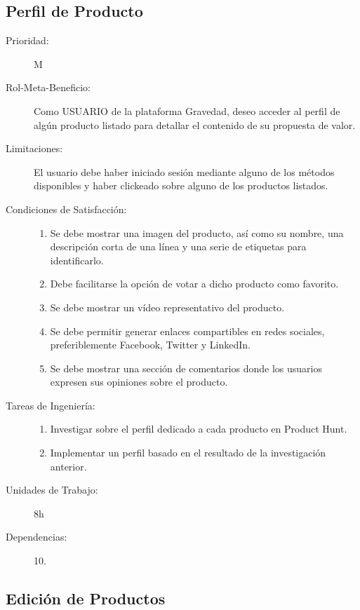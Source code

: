 \newpage


\subsection{Perfil de Producto}

\begin{description}
    \item[Prioridad:] M
    \item[Rol-Meta-Beneficio:]  Como USUARIO de la plataforma Gravedad, deseo acceder al perfil de algún producto listado para detallar el contenido de su propuesta de valor.
    \item[Limitaciones:] El usuario debe haber iniciado sesión mediante alguno de los métodos disponibles y haber clickeado sobre alguno de los productos listados.
    \item[Condiciones de Satisfacción:]  \hfill
        \begin{enumerate}
            \item Se debe mostrar una imagen del producto, así como su nombre, una descripción corta de una línea y una serie de etiquetas para identificarlo.
    		\item Debe facilitarse la opción de votar a dicho producto como favorito.
    		\item Se debe mostrar un vídeo representativo del producto.
    		\item Se debe permitir generar enlaces compartibles en redes sociales, preferiblemente Facebook, Twitter y LinkedIn.
    		\item Se debe mostrar una sección de comentarios donde los usuarios expresen sus opiniones sobre el producto.
        \end{enumerate}
    \item[Tareas de Ingeniería:]  \hfill
        \begin{enumerate}
            \item Investigar sobre el perfil dedicado a cada producto en Product Hunt.
    		\item Implementar un perfil basado en el resultado de la investigación anterior.
        \end{enumerate}
    \item[Unidades de Trabajo:] 8h
    \item[Dependencias:] 10.
\end{description}

\newpage


\subsection{Edición de Productos}

